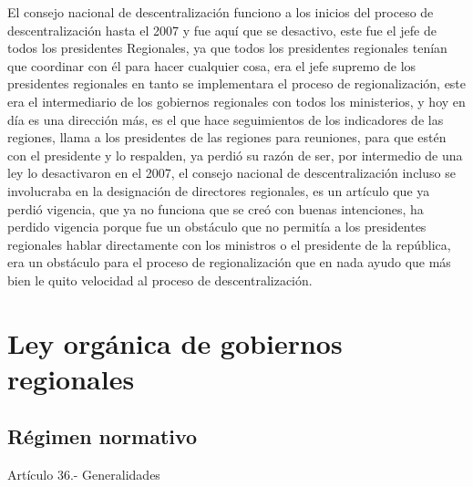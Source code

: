 \documentclass[
  a4paper,
]{article}
\begin{document}
El consejo nacional de descentralización funciono a los inicios del
proceso de descentralización hasta el 2007 y fue aquí que se desactivo,
este fue el jefe de todos los presidentes Regionales, ya que todos los
presidentes regionales tenían que coordinar con él para hacer cualquier
cosa, era el jefe supremo de los presidentes regionales en tanto se
implementara el proceso de regionalización, este era el intermediario de
los gobiernos regionales con todos los ministerios, y hoy en día es una
dirección más, es el que hace seguimientos de los indicadores de las
regiones, llama a los presidentes de las regiones para reuniones, para
que estén con el presidente y lo respalden, ya perdió su razón de ser,
por intermedio de una ley lo desactivaron en el 2007, el consejo
nacional de descentralización incluso se involucraba en la designación
de directores regionales, es un artículo que ya perdió vigencia, que ya
no funciona que se creó con buenas intenciones, ha perdido vigencia
porque fue un obstáculo que no permitía a los presidentes regionales
hablar directamente con los ministros o el presidente de la república,
era un obstáculo para el proceso de regionalización que en nada ayudo
que más bien le quito velocidad al proceso de descentralización.

\section{Ley orgánica de gobiernos
regionales}\label{ley-orguxe1nica-de-gobiernos-regionales}

\subsection{Régimen normativo}\label{ruxe9gimen-normativo}

Artículo 36.- Generalidades
\end{document}
